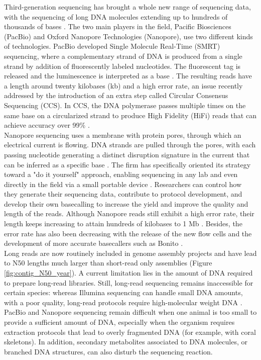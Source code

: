 Third-generation sequencing has brought a whole new range of sequencing data, with the sequencing of long DNA molecules extending up to hundreds of thousands of bases \cite{pollard2018}. The two main players in the field, Pacific Biosciences (PacBio) and Oxford Nanopore Technologies (Nanopore), use two different kinds of technologies. PacBio developed Single Molecule Real-Time (SMRT) sequencing, where a complementary strand of DNA is produced from a single strand by addition of fluorescently labeled nucleotides. The fluorescent tag is released and the luminescence is interpreted as a base \cite{pacbio_smrt}. The resulting reads have a length around twenty kilobases (kb) and a high error rate, an issue recently addressed by the introduction of an extra step called Circular Consensus Sequencing (CCS). In CCS, the DNA polymerase passes multiple times on the same base on a circularized strand to produce High Fidelity (HiFi) reads that can achieve accuracy over 99\% \cite{pacbio_ccs}. \\

Nanopore sequencing uses a membrane with protein pores, through which an electrical current is flowing. DNA strands are pulled through the pores, with each passing nucleotide generating a distinct disruption signature in the current that can be inferred as a specific base \cite{nanopore}. The firm has specifically oriented its strategy toward a "do it yourself" approach, enabling sequencing in any lab and even directly in the field via a small portable device \cite{minion}. Researchers can control how they generate their sequencing data, contribute to protocol development, and develop their own basecalling \cite{basecallers} to increase the yield and improve the quality and length of the reads. Although Nanopore reads still exhibit a high error rate, their length keeps increasing to attain hundreds of kilobases to 1 Mb \cite{Jain2018}. Besides, the error rate has also been decreasing with the release of the new flow cells and the development of more accurate basecallers such as Bonito \cite{bonito}. \\

Long reads are now routinely included in genome assembly projects and have lead to N50 lengths much larger than short-read only assemblies (Figure \ref{fig:contig_N50_year}). A current limitation lies in the amount of DNA required to prepare long-read libraries. Still, long-read sequencing remains inaccessible for certain species: whereas Illumina sequencing can handle small DNA amounts, with a poor quality, long-read protocols require high-molecular weight DNA \cite{dna-extraction}. PacBio and Nanopore sequencing remain difficult when one animal is too small to provide a sufficient amount of DNA, especially when the organism requires extraction protocols that lead to overly fragmented DNA (for example, with coral skeletons). In addition, secondary metabolites associated to DNA molecules, or branched DNA structures, can also disturb the sequencing reaction. \\

